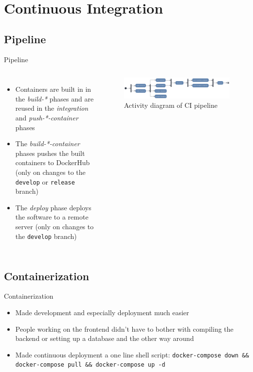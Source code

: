 \documentclass{beamer}
\begin{document}
\section{Continuous Integration}
\subsection{Pipeline}
\begin{frame}{Pipeline}
  \begin{columns}
    \begin{itemize}
      \item Containers are built in in the \textit{build-*} phases and are reused in the \textit{integration} and \textit{push-*-container} phases
      \item The \textit{build-*-container} phases pushes the built containers to DockerHub (only on changes to the \texttt{develop} or \texttt{release} branch)
      \item The \textit{deploy} phase deploys the software to a remote server (only on changes to the \texttt{develop} branch)
    \end{itemize}
    \begin{figure}
      \begin{center}
        \includegraphics[scale=0.09]{ci_activity}
        \caption{Activity diagram of CI pipeline}
      \end{center}
    \end{figure}
  \end{columns}
\end{frame}

\subsection{Containerization}
\begin{frame}{Containerization}
  \begin{itemize}
    \item Made development and especially deployment much easier
    \item People working on the frontend didn't have to bother with compiling the backend or setting up a database and the other way around
    \item Made continuous deployment a one line shell script: \texttt{docker-compose down \&\& docker-compose pull \&\& docker-compose up -d}
  \end{itemize}
\end{frame}
\end{document}
